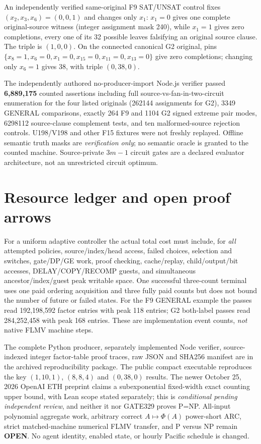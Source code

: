\documentclass[11pt]{article}
\begin{document}
An independently verified same-original F9 SAT/UNSAT control fixes $(x_2,x_3,x_6)=(0,0,1)$ and changes only $x_1$: $x_1=0$ gives one complete original-source witness (integer assignment mask 240), while $x_1=1$ gives zero completions, every one of its 32 possible leaves falsifying an original source clause. The triple is $(1,0,0)$. On the connected canonical G2 original, pins $\{x_8=1,x_6=0,x_1=0,x_{15}=0,x_{11}=0,x_{13}=0\}$ give zero completions; changing only $x_6=1$ gives 38, with triple $(0,38,0)$.

The independently authored no-producer-import Node.js verifier passed \textbf{6,889,175} counted assertions including full source-vs-fan-in-two-circuit enumeration for the four listed originals (262144 assignments for G2), 3349 GENERAL comparisons, exactly 264 F9 and 1104 G2 signed extreme pair modes, 6298112 source-clause complement tests, and ten malformed-source rejection controls. U198/V198 and other F15 fixtures were not freshly replayed. Offline semantic truth masks are \emph{verification only}; no semantic oracle is granted to the counted machine. Source-private $3m-1$ circuit gates are a declared evaluator architecture, not an unrestricted circuit optimum.
\section{Resource ledger and open proof arrows}
For a uniform adaptive controller the actual total cost must include, for \emph{all} attempted policies, source/index/head access, failed choices, selection and switches, gate/DP/GE work, proof checking, cache/replay, child/output/bit accesses, DELAY/COPY/RECOMP guests, and simultaneous ancestor/index/guest peak writable space. One successful three-count terminal uses one paid ordering acquisition and three fully paid counts but does not bound the number of future or failed states. For the F9 GENERAL example the passes read 192,198,592 factor entries with peak 118 entries; G2 both-label passes read 284,252,458 with peak 168 entries. These are implementation event counts, \emph{not} native FLMV machine steps.

The complete Python producer, separately implemented Node verifier, source-indexed integer factor-table proof traces, raw JSON and SHA256 manifest are in the archived reproducibility package. The public compact executable reproduces the key $(1,10,1)$, $(8,8,4)$ and $(0,38,0)$ results. The newer October 25, 2026 OpenAI ETH preprint claims a subexponential fixed-width exact counting upper bound, with Lean scope stated separately; this is \emph{conditional pending independent review}, and neither it nor GATE329 proves P=NP. All-input polynomial aggregate work, arbitrary correct $A\mapsto\Phi(A)$ power-short ARC, strict matched-machine numerical FLMV transfer, and P versus NP remain \textbf{OPEN}. No agent identity, enabled state, or hourly Pacific schedule is changed.
\end{document}
